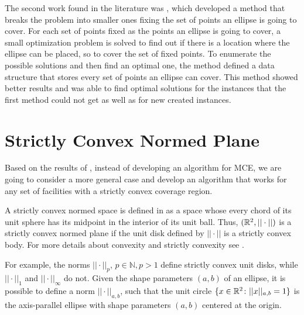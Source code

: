 The second work found in the literature was , which developed a method that breaks the problem into smaller ones fixing the set of points an ellipse is going to cover. For each set of points fixed as the points an ellipse is going to cover, a small optimization problem is solved to find out if there is a location where the ellipse can be placed, so to cover the set of fixed points. To enumerate the possible solutions and then find an optimal one, the method defined a data structure that stores every set of points an ellipse can cover. This method showed better results and was able to find optimal solutions for the instances that the first method could not get as well as for new created instances.

\section{Strictly Convex Normed Plane}

Based on the results of , instead of developing an algorithm for MCE, we are going to consider a more general case and develop an algorithm that works for any set of facilities with a strictly convex coverage region.

A strictly convex normed space is defined in  as a space whose every chord of its unit sphere has its midpoint in the interior of its unit ball.
Thus, $(\mathbb{R}^2, ||\cdot||)$ is a strictly convex normed plane if the unit disk defined by $||\cdot||$ is a strictly convex body. For more details about convexity and strictly convexity see .

For example, the norms $||\cdot||_p$, $p\in \mathbb{N}, p>1$ define strictly convex unit disks, while $||\cdot||_1$ and $||\cdot||_{\infty}$ do not.
Given the shape parameters $(a, b)$ of an ellipse, it is possible to define a norm $||\cdot||_{a,b}$, such that the unit circle $\{x \in \mathbb{R}^2\colon ||x||_{a, b} = 1\}$ is the axis-parallel ellipse with shape parameters $(a, b)$ centered at the origin.




